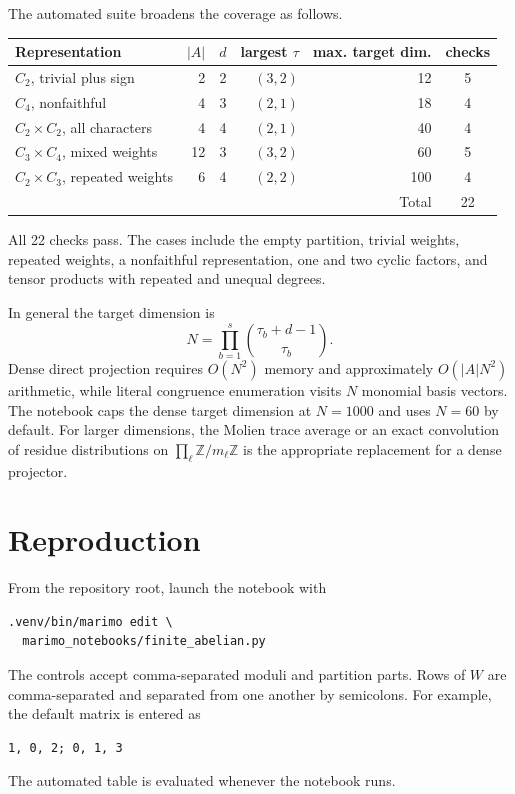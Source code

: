 \documentclass[11pt]{article}
\begin{document}
The automated suite broadens the coverage as follows.
\begin{center}
\small
\begin{tabular}{@{}lrrrrc@{}}
\toprule
Representation & $|A|$ & $d$ & largest $\tau$ & max. target dim. & checks \\
\midrule
$C_2$, trivial plus sign & 2 & 2 & $(3,2)$ & 12 & 5 \\
$C_4$, nonfaithful & 4 & 3 & $(2,1)$ & 18 & 4 \\
$C_2\times C_2$, all characters & 4 & 4 & $(2,1)$ & 40 & 4 \\
$C_3\times C_4$, mixed weights & 12 & 3 & $(3,2)$ & 60 & 5 \\
$C_2\times C_3$, repeated weights & 6 & 4 & $(2,2)$ & 100 & 4 \\
\midrule
\multicolumn{5}{r}{Total} & 22 \\
\bottomrule
\end{tabular}
\end{center}
All 22 checks pass.  The cases include the empty partition, trivial weights,
repeated weights, a nonfaithful representation, one and two cyclic factors,
and tensor products with repeated and unequal degrees.

In general the target dimension is
\begin{equation}\label{eq:target-dim}
 N=\prod_{b=1}^{s}\binom{\tau_b+d-1}{\tau_b}.
\end{equation}
Dense direct projection requires $O(N^2)$ memory and approximately
$O(|A|N^2)$ arithmetic, while literal congruence enumeration visits $N$
monomial basis vectors.  The notebook caps the dense target dimension at
$N=1000$ and uses $N=60$ by default.  For larger dimensions, the Molien trace
average or an exact convolution of residue distributions on
$\prod_\ell\mathbb Z/m_\ell\mathbb Z$ is the appropriate replacement for a
dense projector.

\section{Reproduction}

From the repository root, launch the notebook with
\begin{verbatim}
.venv/bin/marimo edit \
  marimo_notebooks/finite_abelian.py
\end{verbatim}
The controls accept comma-separated moduli and partition parts.  Rows of $W$
are comma-separated and separated from one another by semicolons.  For
example, the default matrix is entered as
\begin{verbatim}
1, 0, 2; 0, 1, 3
\end{verbatim}
The automated table is evaluated whenever the notebook runs.
\end{document}
